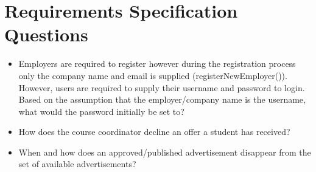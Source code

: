 \documentclass[11pt]{article}
\begin{document}
\newpage

\section{Requirements Specification Questions}

\begin{itemize}

\item{Employers are required to register however during the registration process
only the company name and email is supplied (registerNewEmployer()). However,
users are required to supply their username and password to login. Based on the
assumption that the employer/company name is the username, what would the
password initially be set to?}

\item{How does the course coordinator decline an offer a student has received?}

\item{When and how does an approved/published advertisement disappear from the 
set of available advertisements?}

\end{itemize}
\end{document}
